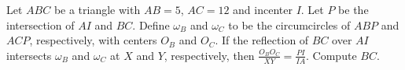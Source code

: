Let $ABC$ be a triangle with $AB=5$, $AC=12$ and incenter $I$. Let $P$ be the intersection of $AI$ and $BC$. Define $\omega_B$ and $\omega_C$ to be the circumcircles of $ABP$ and $ACP$, respectively, with centers $O_B$ and $O_C$. If the reflection of $BC$ over $AI$ intersects $\omega_B$ and $\omega_C$ at $X$ and $Y$, respectively, then $\frac{O_BO_C}{XY}=\frac{PI}{IA}$. Compute $BC$.